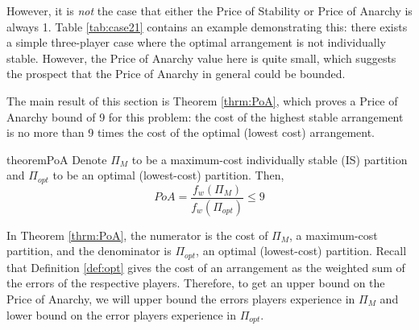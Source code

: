 \documentclass{article}
\newcommand{\costw}[0]{\ensuremath{f_w}}
\newcommand{\partition}[0]{\ensuremath{\Pi}}
\begin{document}
However, it is \emph{not} the case that either the Price of Stability or Price of Anarchy is always 1. Table \ref{tab:case21} contains an example demonstrating this: there exists a simple three-player case where the optimal arrangement is not individually stable. However, the Price of Anarchy value here is quite small, which suggests the prospect that the Price of Anarchy in general could be bounded. %

The main result of this section is Theorem \ref{thrm:PoA}, which proves a Price of Anarchy bound of 9 for this problem: the cost of the highest stable arrangement is no more than 9 times the cost of the optimal (lowest cost) arrangement. 

\begin{restatable}{theorem}{PoA}
\label{thrm:PoA}
Denote $\partition_M$ to be a maximum-cost individually stable (IS) partition and $\partition_{opt}$ to be an optimal (lowest-cost) partition. Then, 
$$PoA = \frac{\costw(\partition_M)}{\costw(\partition_{opt})} \leq 9$$
\end{restatable}

In Theorem \ref{thrm:PoA}, the numerator is the cost of $\partition_M$, a maximum-cost partition, and the denominator is $\partition_{opt}$, an optimal (lowest-cost) partition. Recall that Definition \ref{def:opt} gives the cost of an arrangement as the weighted sum of the errors of the respective players. Therefore, to get an upper bound on the Price of Anarchy, we will upper bound the errors players experience in $\partition_M$ and lower bound on the error players experience in $\partition_{opt}$. 
\end{document}

